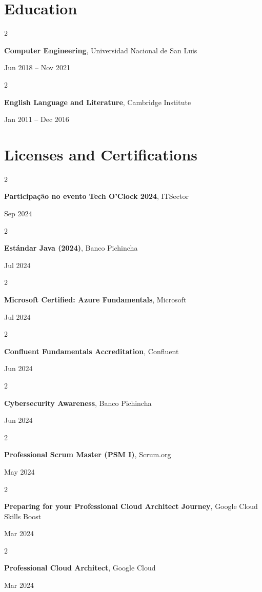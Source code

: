 \documentclass[10pt, letterpaper]{article}
\newenvironment{twocolentry}[2][]{
    \onecolentry
    \def\secondColumn{#2}
    \setcolumnwidth{\fill, 4.5 cm}
    \begin{paracol}{2}
}{
    \switchcolumn \raggedleft \secondColumn
    \end{paracol}
    \endonecolentry
} %
\begin{document}
    \section{Education}                   
    \begin{twocolentry}{
        Jun 2018 – Nov 2021
    }
    \textbf{Computer Engineering}, Universidad Nacional de San Luis
    \end{twocolentry}
    \begin{twocolentry}{
            Jan 2011 – Dec 2016
        }
        \textbf{English Language and Literature}, Cambridge Institute
    \end{twocolentry}
    \section{Licenses and Certifications}
    \begin{twocolentry}{
        Sep 2024
    }
    \textbf{Participação no evento Tech O'Clock 2024}, ITSector
    \end{twocolentry}
    \begin{twocolentry}{
            Jul 2024
        }
        \textbf{Estándar Java (2024)}, Banco Pichincha
    \end{twocolentry}
    \begin{twocolentry}{
        Jul 2024
    }
    \textbf{Microsoft Certified: Azure Fundamentals}, Microsoft
    \end{twocolentry}
    \begin{twocolentry}{
            Jun 2024
        }
        \textbf{Confluent Fundamentals Accreditation}, Confluent
    \end{twocolentry}
    \begin{twocolentry}{
            Jun 2024
        }
        \textbf{Cybersecurity Awareness}, Banco Pichincha
    \end{twocolentry}
    \begin{twocolentry}{
            May 2024
        }
        \textbf{Professional Scrum Master (PSM I)}, Scrum.org
    \end{twocolentry}
    \begin{twocolentry}{
            Mar 2024
        }
        \textbf{Preparing for your Professional Cloud Architect Journey}, Google Cloud Skills Boost
    \end{twocolentry}
    \begin{twocolentry}{
            Mar 2024
        }
        \textbf{Professional Cloud Architect}, Google Cloud
    \end{twocolentry}
\end{document}
